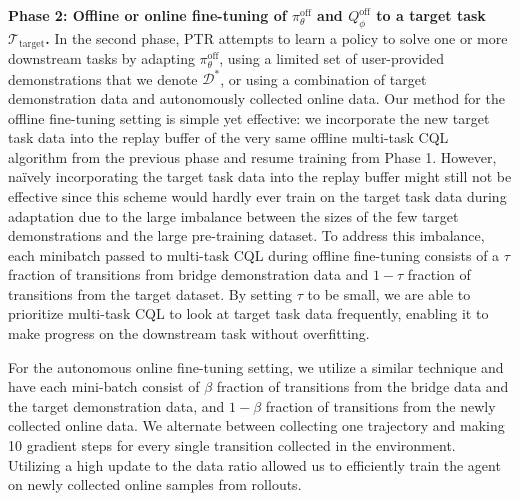 \textbf{Phase 2: Offline or online fine-tuning of $\pi^\text{off}_\theta$ and $Q^\text{off}_\phi$ to a target task $\mathcal{T}_\text{target}$.} In the second phase, PTR attempts to learn a policy to solve one or more downstream tasks by adapting $\pi^\text{off}_\theta$, using a limited set of user-provided demonstrations that we denote $\mathcal{D}^*$, or using a combination of target demonstration data and autonomously collected online data. Our method for the offline fine-tuning setting is simple yet effective: we incorporate the new target task data into the replay buffer of the very same offline multi-task CQL algorithm from the previous phase and resume training from Phase 1. However, na\"ively incorporating the target task data into the replay buffer might still not be effective since this scheme would hardly ever train on the target task data during adaptation due to the large imbalance between the sizes of the few target demonstrations and the large pre-training dataset. 
To address this imbalance, each minibatch passed to multi-task CQL during offline fine-tuning consists of a $\tau$ fraction of transitions from bridge demonstration data and $1 - \tau$ fraction of transitions from the target dataset. By setting $\tau$ to be small, we are able to prioritize multi-task CQL to look at target task data frequently, enabling it to make progress on the downstream task without overfitting.

For the autonomous online fine-tuning setting, we utilize a similar technique and have each mini-batch consist of $\beta$ fraction of transitions from the bridge data and the target demonstration data, and $1 - \beta$ fraction of transitions from the newly collected online data. We alternate between collecting one trajectory and making 10 gradient steps for every single transition collected in the environment. Utilizing a high update to the data ratio allowed us to efficiently train the agent on newly collected online samples from rollouts.

